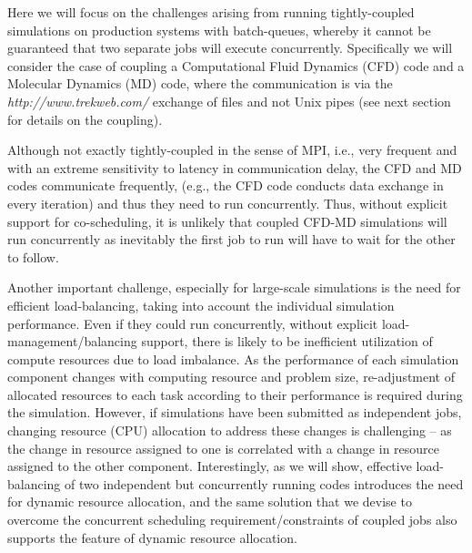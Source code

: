 \documentclass[conference,final]{IEEEtran}
\newcommand{\jhanote}[1]{ {\textcolor{red} { ***Jha: #1 }}}
\newcommand{\jhanote}[1]{}
\begin{document}
Here we will focus on the challenges arising from running
tightly-coupled simulations on production systems with batch-queues,
whereby it cannot be guaranteed that two separate jobs will execute
concurrently. Specifically we will consider the case of coupling a
Computational Fluid Dynamics (CFD) code and a Molecular Dynamics (MD)
code, where the communication is via the {\it
  http://www.trekweb.com/} exchange of files and not Unix pipes (see
next section for details on the coupling). 


Although not exactly tightly-coupled in the sense of MPI, i.e., very
frequent and with an extreme sensitivity to latency in communication
delay, the CFD and MD codes communicate frequently, (e.g., the CFD
code conducts data exchange in every iteration) and thus they need to
run concurrently. Thus, without explicit support for co-scheduling, it
is unlikely that coupled CFD-MD simulations will run concurrently as
inevitably the first job to run will have to wait for the other to
follow.


Another important challenge, especially for large-scale simulations is
the need for efficient load-balancing, taking into account the
individual simulation performance. Even if they could run
concurrently, without explicit load-management/balancing support,
there is likely to be inefficient utilization of compute resources due
to load imbalance. As the performance of each simulation component
changes with computing resource and problem size, re-adjustment of
allocated resources to each task according to their performance is
required during the simulation. However, if simulations have been
submitted as independent jobs, changing resource (CPU) allocation to
address these changes is challenging -- as the change in resource
assigned to one is correlated with a change in resource assigned to
the other component. Interestingly, as we will show, effective
load-balancing of two independent but concurrently running codes
introduces the need for dynamic resource allocation, and the same
solution that we devise to overcome the concurrent scheduling
requirement/constraints of coupled jobs also supports the feature of
dynamic resource allocation.
\end{document}
